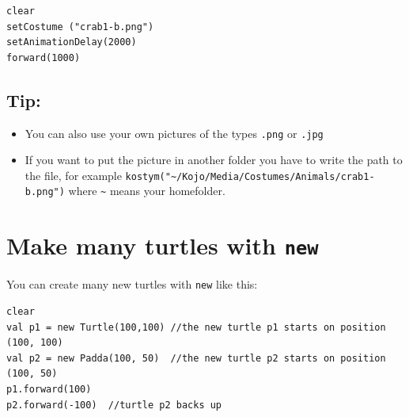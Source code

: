 \begin{lstlisting}[basicstyle={\ttfamily\fontsize{20}{24}\selectfont},numbers=none]
clear
setCostume ("crab1-b.png")  
setAnimationDelay(2000)
forward(1000)
\end{lstlisting}
        
\section*{\color{OliveGreen}Tip:}


\begin{itemize}

\item {You can also use your own pictures of the types \lstinline{.png} or \lstinline{.jpg}}
\item {If you want to put the picture in another folder you have to write the path to the file, for example \lstinline{kostym("~/Kojo/Media/Costumes/Animals/crab1-b.png")} where \lstinline{~} means your homefolder.}

\end{itemize}


\chapter{Make many turtles with \lstinline{new}}You can create many new turtles with \lstinline{new} like this:

\begin{lstlisting}[basicstyle={\ttfamily\fontsize{18}{22}\selectfont},numbers=none]
clear
val p1 = new Turtle(100,100) //the new turtle p1 starts on position (100, 100)
val p2 = new Padda(100, 50)  //the new turtle p2 starts on position (100, 50)
p1.forward(100)
p2.forward(-100)  //turtle p2 backs up
\end{lstlisting}
        

  
